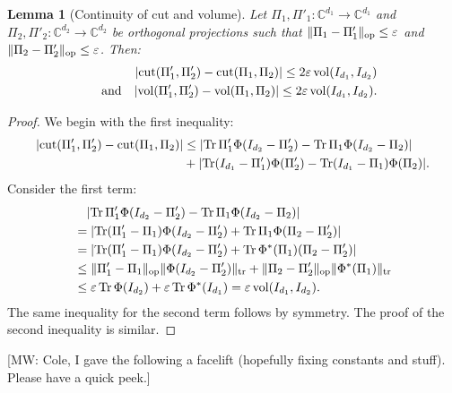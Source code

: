 \documentclass[aos]{imsart}
\newtheorem{lemma}[theorem]{Lemma}
\theoremstyle{definition}
\numberwithin{equation}{section}
\DeclareMathOperator{\op}{op}
\DeclareMathOperator{\vol}{vol}
\DeclareMathOperator{\cut}{cut}
\DeclareMathOperator{\tr}{Tr}
\DeclarePairedDelimiter{\abs}{\lvert}{\rvert}
\DeclarePairedDelimiter{\norm}{\lVert}{\rVert}
\newcommand{\C}{{\mathbb{C}}}
\newcommand{\eps}{\varepsilon}
\newcommand{\MW}[1]{{\color{red}[MW: #1]}}
\newcommand{\MW}[1]{{}}
\begin{document}
\begin{appendix}
\begin{lemma}[Continuity of cut and volume]\label{lem:net-suffices}
Let $\Pi_1,\Pi'_1 \colon \C^{d_1}\to\C^{d_1}$ and $\Pi_2,\Pi'_2\colon\C^{d_2}\to\C^{d_2}$ be orthogonal projections such that $\norm{\Pi_1 - \Pi'_1}_{\op}\leq\eps$ and $\norm{\Pi_2 - \Pi'_2}_{\op}\leq\eps$.
Then:
\begin{align*}
  \abs{\cut(\Pi'_1,\Pi'_2) - \cut(\Pi_1,\Pi_2)}
\leq 2 \eps \vol(I_{d_1}, I_{d_2}) \\
  \quad\text{and}\quad
  \abs{\vol(\Pi'_1,\Pi'_2) - \vol(\Pi_1,\Pi_2)}
\leq 2 \eps \vol(I_{d_1}, I_{d_2}).
\end{align*}
\end{lemma}
\begin{proof}
We begin with the first inequality:
\begin{align*}
  \abs{\cut(\Pi'_1,\Pi'_2) - \cut(\Pi_1,\Pi_2)}
&\leq \abs{\tr \Pi'_1 \Phi(I_{d_2} - \Pi'_2) - \tr \Pi_1 \Phi(I_{d_2} - \Pi_2)} \\
&+ \abs{\tr (I_{d_1} - \Pi'_1) \Phi(\Pi'_2) - \tr (I_{d_1} - \Pi_1) \Phi(\Pi_2)}.
\end{align*}
Consider the first term:
\begin{align*}
&\quad \abs{\tr \Pi'_1 \Phi(I_{d_2} - \Pi'_2) - \tr \Pi_1 \Phi(I_{d_2} - \Pi_2)} \\
&= \abs{\tr (\Pi'_1 - \Pi_1) \Phi(I_{d_2} - \Pi'_2) + \tr \Pi_1 \Phi(\Pi_2 - \Pi'_2)} \\
&= \abs{\tr (\Pi'_1 - \Pi_1) \Phi(I_{d_2} - \Pi'_2) + \tr \Phi^*(\Pi_1) (\Pi_2 - \Pi'_2)} \\
&\leq \norm{\Pi'_1 - \Pi_1}_{\op} \norm{\Phi(I_{d_2} - \Pi'_2)}_{\operatorname{tr}} + \norm{\Pi_2 - \Pi'_2}_{\op} \norm{\Phi^*(\Pi_1)}_{\operatorname{tr}} \\
&\leq \eps \tr \Phi(I_{d_2}) + \eps \tr \Phi^*(I_{d_1})
= \eps \vol(I_{d_1}, I_{d_2}).
\end{align*}
The same inequality for the second term follows by symmetry.
The proof of the second inequality is similar.
\end{proof}

\MW{Cole, I gave the following a facelift (hopefully fixing constants and stuff). Please have a quick peek.}


\end{appendix}
\end{document}
